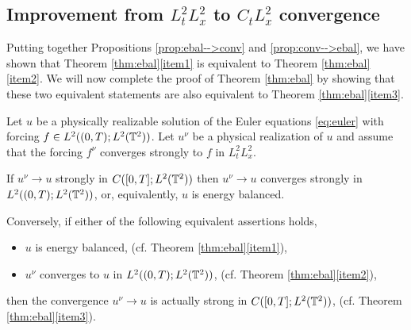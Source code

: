 \documentclass[reqno,12pt]{amsart}
\begin{document}

\subsection{Improvement from $L^2_tL^2_x$ to $C_tL^2_x$ convergence}
\label{sec:contt}

Putting together  Propositions \ref{prop:ebal-->conv} and \ref{prop:conv-->ebal}, we have shown that Theorem \ref{thm:ebal}\eqref{item1} is equivalent to Theorem \ref{thm:ebal}\eqref{item2}. We will now complete the proof of Theorem \ref{thm:ebal} by showing that these two equivalent statements are also equivalent to Theorem \ref{thm:ebal}\eqref{item3}.


\begin{proposition}
\label{prop:contt}
Let $u$ be a physically realizable solution of the Euler equations \eqref{eq:euler}  with forcing $f\in L^2 ((0,T);L^2 (\mathbb{T}^2))$. Let $u^\nu$ be a physical realization of $u$ and assume that the forcing $f^\nu$ converges strongly to $f$ in $L^2_t L^2_x$.

If $u^\nu \to u$  strongly in $C([0,T];L^2(\mathbb{T}^2))$ then $u^\nu \to u$ converges strongly in $L^2((0,T);L^2(\mathbb{T}^2))$, or, equivalently, $u$ is energy balanced.

Conversely, if either of the following equivalent assertions holds,
\begin{itemize}
\item $u$ is energy balanced, (cf. Theorem \ref{thm:ebal}\eqref{item1}),
\item $u^\nu$ converges to $u$  in $L^2((0,T);L^2(\mathbb{T}^2))$, (cf. Theorem \ref{thm:ebal}\eqref{item2}),
\end{itemize}
then the convergence $u^\nu \to u$ is actually strong in $C([0,T];L^2(\mathbb{T}^2))$, (cf. Theorem \ref{thm:ebal}\eqref{item3}).
\end{proposition}
\end{document}

